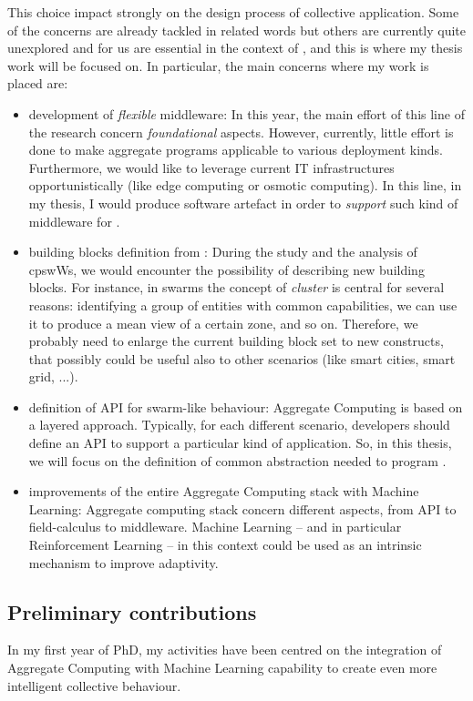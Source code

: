 \documentclass[11pt]{article}
\begin{document}
This choice impact strongly on the design process of collective application. Some of the concerns are already tackled in related words but others are currently quite unexplored and for us are essential in the context of \cpsw{}, and this is where my thesis work will be focused on.
In particular, the main concerns where my work is placed are:
\begin{itemize}
	\item development of \textit{flexible} middleware: In this year, the main effort of this line of the research concern \textit{foundational} aspects. However, currently, little effort is done to make aggregate programs applicable to various deployment kinds. Furthermore, we would like to leverage current IT infrastructures opportunistically (like edge computing or osmotic computing). In this line, in my thesis, I would produce software artefact in order to \textit{support} such kind of middleware for \cpsw{}.
	\item building blocks definition from \cpsw{}: During the study and the analysis of cpswWs, we would encounter the possibility of describing new building blocks. For instance, in swarms the concept of \emph{cluster} is central for several reasons: identifying a group of entities with common capabilities, we can use it to produce a mean view of a certain zone, and so on. Therefore, we probably need to enlarge the current building block set to new constructs, that possibly could be useful also to other scenarios (like smart cities, smart grid, ...).
	\item definition of API for swarm-like behaviour: Aggregate Computing is based on a layered approach. Typically, for each different scenario, developers should define an API to support a particular kind of application. So, in this thesis, we will focus on the definition of common abstraction needed to program \cpsw{}.
	\item improvements of the entire Aggregate Computing stack with Machine Learning: Aggregate computing stack concern different aspects, from API to field-calculus to middleware. Machine Learning -- and in particular Reinforcement Learning -- in this context could be used as an intrinsic mechanism to improve adaptivity.
\end{itemize}

\subsection{Preliminary contributions}
In my first year of PhD, my activities have been centred on
the integration of Aggregate Computing with Machine Learning capability to create even more
intelligent collective behaviour. 
\end{document}
